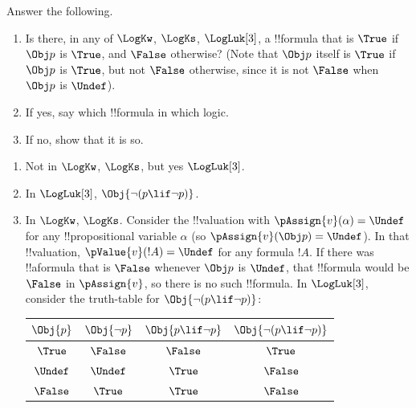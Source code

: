\documentclass[../../../../include/open-logic-section]{subfiles}
\begin{document}
\begin{prob}
Answer the following.
\begin{enumerate}
	\item Is there, in any of $\LogKw$, $\LogKs$, $\LogLuk[3]$, a !!{formula} that is $\True$ if $\Obj p$ is $\True$, and $\False$ otherwise? (Note that $\Obj p$ itself is $\True$ if $\Obj p$ is $\True$, but not $\False$ otherwise, since it is not $\False$ when $\Obj p$ is $\Undef$).
	\item If yes, say which !!{formula} in which logic.
	\item If no, show that it is so. 
\end{enumerate}
\begin{ans}
\begin{enumerate}
	\item Not in $\LogKw$, $\LogKs$, but yes $\LogLuk[3]$.
	\item In $\LogLuk[3]$, $\Obj{\lnot (p \lif \lnot p)}$.
	\item In $\LogKw$, $\LogKs$. Consider the !!{valuation} with $\pAssign{v}(\alpha)=\Undef$ for any !!{propositional variable} $\alpha$ (so $\pAssign{v}(\Obj p)=\Undef$). In that !!{valuation}, $\pValue{v}(!A)=\Undef$ for any formula $!A$. If there was !!a{formula} that is $\False$ whenever $\Obj p$ is $\Undef$, that !!{formula} 
	would be $\False$ in $\pAssign{v}$, so there is no such !!{formula}. 
	In $\LogLuk[3]$, consider the truth-table for $\Obj{\lnot (p \lif \lnot p)}$:
	\begin{center}
	\begin{tabular}{c|ccc}
	\hline
	$\Obj{p}$ & $\Obj{\lnot p}$ & $\Obj{p \lif \lnot p}$ & $\Obj{\lnot (p \lif \lnot p)}$\\
	\hline
	$\True$ & $\False$ & $\False$ & $\True$ \\
	$\Undef$ & $\Undef$ & $\True$ & $\False$ \\
	$\False$ & $\True$ & $\True$ & $\False$ \\
	\hline
	\end{tabular}
	\end{center} 
\end{enumerate}
\end{ans}
\end{prob}
\end{document}
